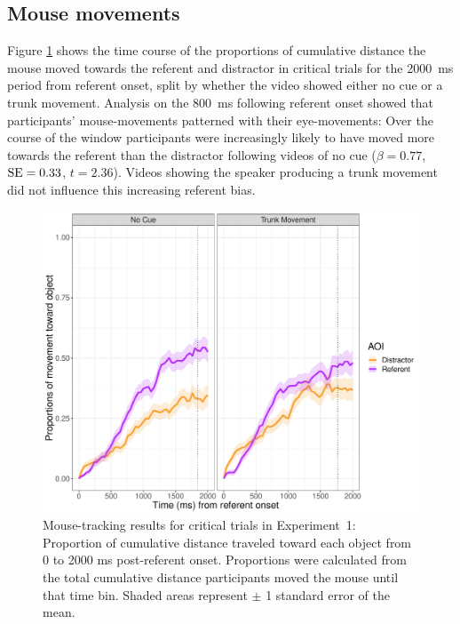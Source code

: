 \documentclass[a4paper,man,natbib]{apa6}
\newcommand{\resultsLM}[3]{$\beta = #1$, $\textnormal{SE} = #2$, $t #3$}
\begin{document}
\subsection{Mouse movements}
Figure \ref{fig:v1_mouse1} shows the time course of the proportions of cumulative distance the mouse moved towards the referent and distractor in critical trials for the 2000~ms period from referent onset, split by whether the video showed either no cue or a trunk movement.
Analysis on the 800~ms following referent onset showed that participants' mouse-movements patterned with their eye-movements:
Over the course of the window participants were increasingly likely to have moved more towards the referent than the distractor following videos of no cue (\resultsLM{0.77}{0.33}{=2.36}). 
Videos showing the speaker producing a trunk movement did not influence this increasing referent bias.


\begin{figure}[Ht]
  \centering
	\includegraphics[width=\linewidth]{./img/e7_mouse_crit.pdf}
  \caption{Mouse-tracking results for critical trials in Experiment~1: Proportion of cumulative distance traveled toward each object from 0 to 2000 ms post-referent onset. Proportions were calculated from the total cumulative distance participants moved the mouse until that time bin. Shaded areas represent $\pm$ 1 standard error of the mean.}
  \label{fig:v1_mouse1}
\end{figure}
\end{document}
